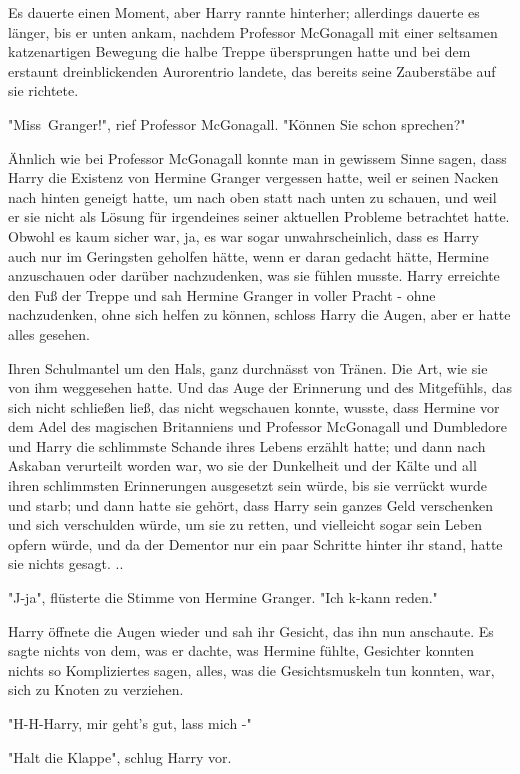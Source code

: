 {Es dauerte einen Moment, aber Harry rannte hinterher; allerdings dauerte es länger, bis er unten ankam, nachdem Professor McGonagall mit einer seltsamen katzenartigen Bewegung die halbe Treppe übersprungen hatte und bei dem erstaunt dreinblickenden Aurorentrio landete, das bereits seine Zauberstäbe auf sie richtete.

"Miss~Granger!", rief Professor McGonagall. "Können Sie schon sprechen?"

Ähnlich wie bei Professor McGonagall konnte man in gewissem Sinne sagen, dass Harry die Existenz von Hermine Granger vergessen hatte, weil er seinen Nacken nach hinten geneigt hatte, um nach oben statt nach unten zu schauen, und weil er sie nicht als Lösung für irgendeines seiner aktuellen Probleme betrachtet hatte. Obwohl es kaum sicher war, ja, es war sogar unwahrscheinlich, dass es Harry auch nur im Geringsten geholfen hätte, wenn er daran gedacht hätte, Hermine anzuschauen oder darüber nachzudenken, was sie fühlen musste. Harry erreichte den Fuß der Treppe und sah Hermine Granger in voller Pracht - ohne nachzudenken, ohne sich helfen zu können, schloss Harry die Augen, aber er hatte alles gesehen.

Ihren Schulmantel um den Hals, ganz durchnässt von Tränen. Die Art, wie sie von ihm weggesehen hatte. Und das Auge der Erinnerung und des Mitgefühls, das sich nicht schließen ließ, das nicht wegschauen konnte, wusste, dass Hermine vor dem Adel des magischen Britanniens und Professor McGonagall und Dumbledore und Harry die schlimmste Schande ihres Lebens erzählt hatte; und dann nach Askaban verurteilt worden war, wo sie der Dunkelheit und der Kälte und all ihren schlimmsten Erinnerungen ausgesetzt sein würde, bis sie verrückt wurde und starb; und dann hatte sie gehört, dass Harry sein ganzes Geld verschenken und sich verschulden würde, um sie zu retten, und vielleicht sogar sein Leben opfern würde, und da der Dementor nur ein paar Schritte hinter ihr stand, hatte sie nichts gesagt. ..

"J-ja", flüsterte die Stimme von Hermine Granger. "Ich k-kann reden."

Harry öffnete die Augen wieder und sah ihr Gesicht, das ihn nun anschaute. Es sagte nichts von dem, was er dachte, was Hermine fühlte, Gesichter konnten nichts so Kompliziertes sagen, alles, was die Gesichtsmuskeln tun konnten, war, sich zu Knoten zu verziehen.

"H-H-Harry, mir geht's gut, lass mich -"

"Halt die Klappe", schlug Harry vor.

}
